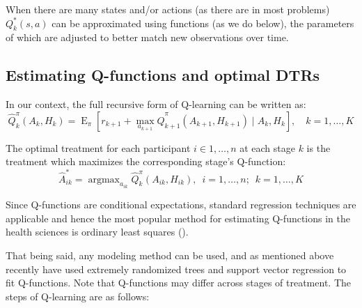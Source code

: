 \documentclass[12pt]{article}
\DeclareMathOperator*{\argmax}{argmax}
\begin{document}
When there are many states and/or actions (as there are in most problems) \( Q^{*}_{k}(s, a) \) can be approximated using functions (as we do below), the parameters of which are adjusted to better match new observations over time. %



\subsection{Estimating Q-functions and optimal DTRs} %
\label{sub:estimating_q_functions}

In our context, the full recursive form of Q-learning can be written as:
  \begin{equation}
     \hat{Q}^{\pi}_{k}(A_{k}, H_{k})  = \operatorname{E}_{\pi}[r_{k+1} + \max_{a_{k+1}} \hat{Q}^{\pi}_{k+1}(A_{k+1}, H_{k+1}) \mid A_{k}, H_{k}], \quad k = 1, \ldots, K
  \end{equation}
  
The optimal treatment for each participant $i \in 1, \ldots, n$ at each stage $k$ is the treatment which maximizes the corresponding stage's Q-function:
  \begin{equation}
    \hat{A}^{*}_{ik} = \argmax_{a_{ik}} \hat{Q}^{\pi}_{k}(A_{ik}, H_{ik}), \enspace i = 1, \ldots, n; \enspace k = 1, \ldots, K
  \end{equation}

Since Q-functions are conditional expectations, standard regression techniques are applicable and hence the most popular method for estimating Q-functions in the health sciences is ordinary least squares (\cite{dtr-review}).

That being said, any modeling method can be used, and as mentioned above recently \textcite{crt} have used extremely randomized trees and support vector regression to fit Q-functions. Note that Q-functions may differ across stages of treatment. The steps of Q-learning are as follows:
\end{document}
